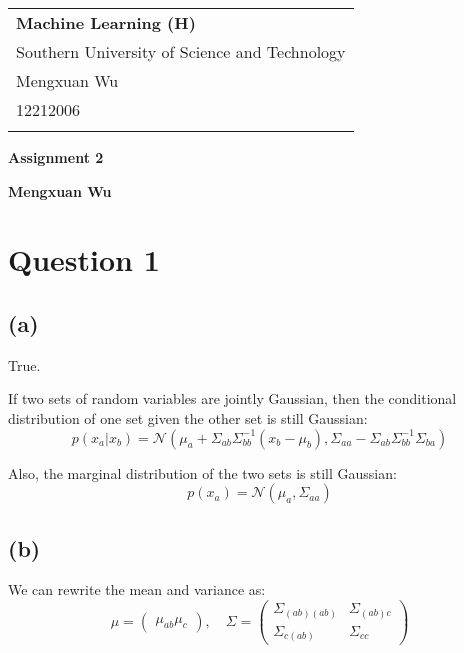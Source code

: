 \documentclass[a4paper,12pt]{article}
\begin{document}
\thispagestyle{empty} %

\begin{tabular}{p{15.5cm}}
{\large \bf Machine Learning (H)} \\
Southern University of Science and Technology \\ Mengxuan Wu \\ 12212006 \\
\hline
\\
\end{tabular}

\vspace*{0.3cm} %

\begin{center}
	{\Large \bf Assignment 2}
	\vspace{2mm}

	{\bf Mengxuan Wu}
		
\end{center}  

\vspace{0.4cm}

\section*{Question 1}

\subsection*{(a)}

True.

If two sets of random variables are jointly Gaussian, then the conditional distribution of one set given the other set is still Gaussian:
\begin{equation*}
	p(x_a|x_b) = \mathcal{N}(\mu_a + \Sigma_{ab}\Sigma_{bb}^{-1}(x_b - \mu_b), \Sigma_{aa} - \Sigma_{ab}\Sigma_{bb}^{-1}\Sigma_{ba})
\end{equation*}

Also, the marginal distribution of the two sets is still Gaussian:
\begin{equation*}
	p(x_a) = \mathcal{N}(\mu_a, \Sigma_{aa})
\end{equation*}

\subsection*{(b)}

We can rewrite the mean and variance as:
\begin{equation*}
	\mu = \begin{pmatrix}
		\mu_{ab}
		\mu_c
	\end{pmatrix}, 
	\quad 
	\Sigma = \begin{pmatrix}
		\Sigma_{(ab)(ab)} & \Sigma_{(ab)c} \\
		\Sigma_{c(ab)} & \Sigma_{cc}
	\end{pmatrix}
\end{equation*}
\end{document}
